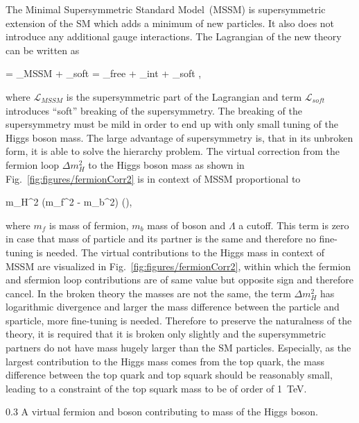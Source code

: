 The Minimal Supersymmetric Standard Model~(MSSM) is supersymmetric extension of the SM which adds a minimum of new particles. It also does not introduce any additional gauge interactions. The Lagrangian of the new theory can be written as

{
     =  _{MSSM} +  _{soft} = _{free} + _{int} + _{soft}    ,
}

where $\mathcal{L}_{MSSM}$ is the supersymmetric part of the Lagrangian and term $\mathcal{L}_{soft}$ introduces ``soft'' breaking of the supersymmetry. The breaking of the supersymmetry must be mild in order to end up with only small tuning of the Higgs boson mass. The large advantage of supersymmetry is, that in its unbroken form, it is able to solve the hierarchy problem. The virtual correction from the fermion loop $\Delta m_{H}^{2}$ to the Higgs boson mass as shown in Fig.~\ref{fig:figures/fermionCorr2} is  in context of MSSM proportional to

{
\Delta m_{H}^{2} \propto (m_{f}^{2} - m_{b}^2) (),
}

where $m_{f}$ is mass of fermion, $m_{b}$ mass of boson and $\Lambda$ a cutoff. This term is zero in case that mass of particle and its partner is the same and therefore no fine-tuning is needed. The virtual contributions to the Higgs mass in context of MSSM are visualized in Fig.~\ref{fig:figures/fermionCorr2}, within which the fermion and sfermion loop contributions are of same value but opposite sign and therefore cancel. In the broken theory the masses are not the same, the term $\Delta m_{H}^{2}$ has logarithmic divergence and larger the mass difference between the particle and sparticle, more fine-tuning is needed. Therefore to preserve the naturalness of the theory, it is required that it is broken only slightly and the supersymmetric partners do not have mass hugely larger than the SM particles. Especially, as the largest  contribution to the Higgs mass comes from the top quark, the mass difference between the top quark and top squark should be reasonably small, leading to a constraint of the top squark mass to be of order of 1~TeV.

                 {0.3}       %
                 { A virtual fermion and boson contributing to mass of the Higgs boson.}

